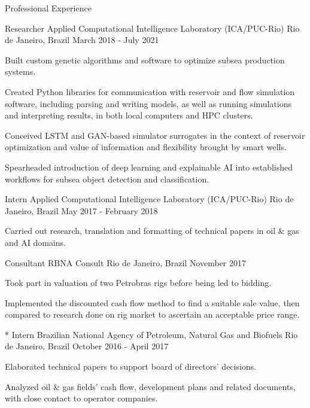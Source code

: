 \begin{cvcontentsection}{Professional Experience}
\begin{cvjob}
    {Researcher}
    {Applied Computational Intelligence Laboratory (ICA/PUC-Rio)}
    {Rio de Janeiro, Brazil}
    {March 2018 - July 2021}
    \item Built custom genetic algorithms and software to optimize subsea production systems.
    \item Created Python libraries for communication with reservoir and flow simulation software, including parsing and writing models, as well as running simulations and interpreting results, in both local computers and HPC clusters.
    \item Conceived LSTM and GAN-based simulator surrogates in the context of reservoir optimization and value of information and flexibility brought by smart wells.
    \item Spearheaded introduction of deep learning and explainable AI into established workflows for subsea object detection and classification.
\end{cvjob}

\begin{cvjob}
    {Intern}
    {Applied Computational Intelligence Laboratory (ICA/PUC-Rio)}
    {Rio de Janeiro, Brazil}
    {May 2017 - February 2018}
    \item Carried out research, translation and formatting of technical papers in oil \& gas and AI domains.
\end{cvjob}

\begin{cvjob}
    {Consultant}
    {RBNA Consult}
    {Rio de Janeiro, Brazil}
    {November 2017}
    \item Took part in valuation of two Petrobras rigs before being led to bidding.
    \item Implemented the discounted cash flow method to find a suitable sale value, then compared to research done on rig market to ascertain an acceptable price range.

\end{cvjob}

\begin{cvjob}*
    {Intern}
    {Brazilian National Agency of Petroleum, Natural Gas and Biofuels}
    {Rio de Janeiro, Brazil}
    {October 2016 - April 2017}
    \item Elaborated technical papers to support board of directors' decisions.
    \item Analyzed oil \& gas fields' cash flow, development plans and related documents, with close contact to operator companies.
\end{cvjob}

\end{cvcontentsection}
